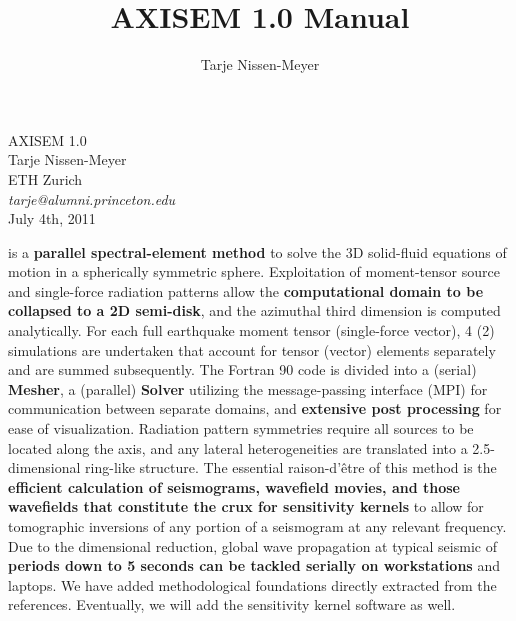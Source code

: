 \documentclass[11pt,letter,fleqn,english,notitlepage]{article}
\title{AXISEM 1.0 Manual}
\author{Tarje Nissen-Meyer}
\begin{document}
%
\pagestyle{fancy}
\thispagestyle{empty}
%
\begin{center}
{\LARGE {\sc AXISEM 1.0}}
\vspace{1.cm}\\
{\large 
Tarje Nissen-Meyer  \hspace*{0.1cm}
\vspace*{0.2cm}\\ 
ETH Zurich   \hspace*{0.3cm}
\vspace*{0.2cm}\\ 
\textit{tarje@alumni.princeton.edu} \hspace*{0.75cm}
\vspace*{0.5cm}\\ 
July 4th, 2011}
\end{center}
\vspace*{1.6cm}
 is a \textbf{parallel spectral-element method} to 
solve the 3D solid-fluid equations of motion in a spherically symmetric sphere. Exploitation 
of moment-tensor source and single-force radiation patterns allow the \textbf{computational domain 
to be collapsed to a 2D semi-disk}, and the azimuthal third dimension is computed analytically.
For each full earthquake moment tensor (single-force vector), 4 (2) simulations are undertaken that account for  
tensor (vector) elements separately and are summed subsequently.
The Fortran 90 code is divided into a (serial) \textbf{Mesher}, a (parallel) \textbf{Solver} utilizing the message-passing interface 
(MPI) for communication between separate domains, and \textbf{extensive post processing} for ease of visualization.
Radiation pattern symmetries require all sources 
to be located along the axis, and any lateral heterogeneities are translated into a 2.5-dimensional
ring-like structure.
The essential raison-d'\^{e}tre of this method is the \textbf{efficient calculation 
of seismograms, wavefield movies, and those wavefields that constitute the crux for 
sensitivity kernels} to allow for tomographic inversions of any portion of a seismogram at any relevant 
frequency. Due to the dimensional reduction, global 
wave propagation at typical seismic of \textbf{periods down to 5 seconds can be tackled serially on workstations} and laptops.
We have added methodological foundations directly extracted from the references.
Eventually, we will add the sensitivity kernel software as well. 
\end{document}
